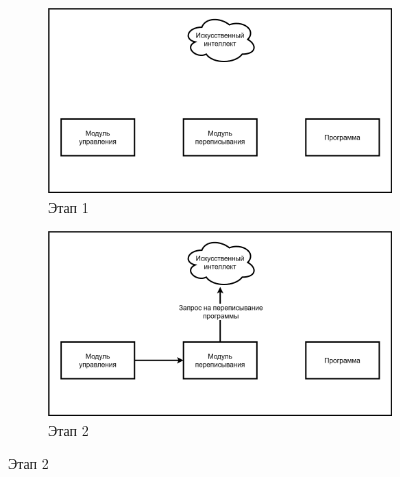 \begin{figure}[h!] %
    \centering %

    \begin{subfigure}[b]{0.5\textwidth} %
        \centering
        \includegraphics[width=\textwidth]{images/METAMORPHLLM0.png} %
        \caption{Этап 1}
        \label{fig:photo_221_1}
    \end{subfigure}%
    \hfill %
    \begin{subfigure}[b]{0.5\textwidth}
        \centering
        \includegraphics[width=\textwidth]{images/METAMORPHLLM1.png} %
        \caption{Этап 2}
        \label{fig:photo_221_2}
    \end{subfigure}

    \vspace{\baselineskip} %


\end{figure}
